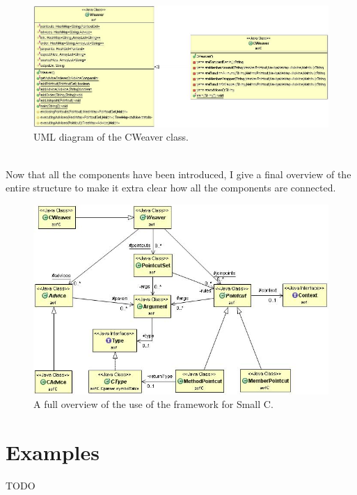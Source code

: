 \documentclass[a4paper]{report}
\begin{document}
\begin{figure}
\centering
\includegraphics[scale=0.7]{images/AOFC/CWeaver.jpg}
\caption{UML diagram of the CWeaver class.}
\label{fig:CWeaver}
\end{figure}
\\
Now that all the components have been introduced, I give a final overview of the entire structure to make it extra clear how all the components are connected.\\
\begin{figure}
\centering
\includegraphics[scale=0.55]{images/AOFC/CFull.jpg}
\caption{A full overview of the use of the framework for Small C.}
\label{fig:CFull}
\end{figure}

\section{Examples}
TODO
\end{document}
